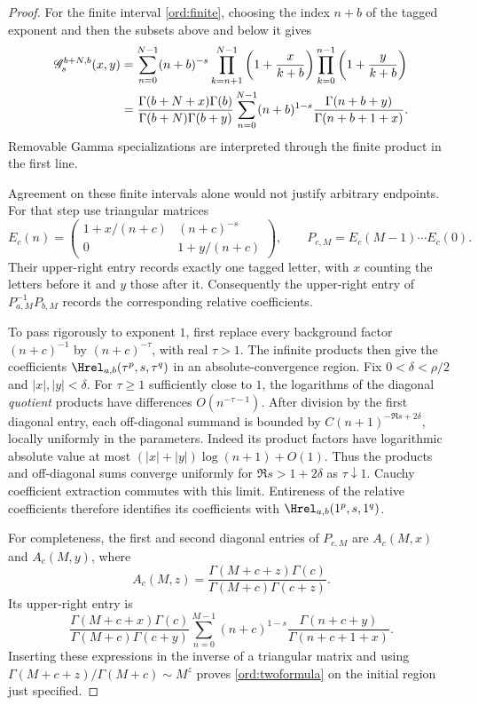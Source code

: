 \begin{proof}
For the finite interval \eqref{ord:finite}, choosing the index $n+b$ of
the tagged exponent and then the subsets above and below it gives
\begin{align}
 \mathscr G_s^{b+N,b}(x,y)
 &=\sum_{n=0}^{N-1}(n+b)^{-s}
       \prod_{k=n+1}^{N-1}\left(1+\frac{x}{k+b}\right)
       \prod_{k=0}^{n-1}\left(1+\frac{y}{k+b}\right) \notag\\
 &=\frac{\Gamma(b+N+x)\Gamma(b)}
          {\Gamma(b+N)\Gamma(b+y)}
    \sum_{n=0}^{N-1}(n+b)^{1-s}
          \frac{\Gamma(n+b+y)}{\Gamma(n+b+1+x)}.
 \label{ord:finitegamma}
\end{align}
Removable Gamma specializations are interpreted through the finite
product in the first line.

Agreement on these finite intervals alone would not justify arbitrary
endpoints.  For that step use triangular matrices
\[
 E_c(n)=
 \begin{pmatrix}
  1+x/(n+c)&(n+c)^{-s}\\
  0&1+y/(n+c)
 \end{pmatrix},
 \qquad P_{c,M}=E_c(M-1)\cdots E_c(0).
\]
Their upper-right entry records exactly one tagged letter, with $x$
counting the letters before it and $y$ those after it.  Consequently
the upper-right entry of $P_{a,M}^{-1}P_{b,M}$ records the corresponding
relative coefficients.

To pass rigorously to exponent $1$, first replace every background
factor $(n+c)^{-1}$ by $(n+c)^{-\tau}$, with real $\tau>1$.
The infinite products then give the coefficients
$\Hrel_{a,b}(\tau^p,s,\tau^q)$ in an absolute-convergence region.
Fix $0<\delta<\rho/2$ and $|x|,|y|<\delta$.  For $\tau\ge1$
sufficiently close to $1$, the logarithms of the diagonal
\emph{quotient} products have differences $O(n^{-\tau-1})$.
After division by the first diagonal entry, each off-diagonal summand
is bounded by
$C(n+1)^{-\Re s+2\delta}$, locally uniformly in the parameters.
Indeed its product factors have logarithmic absolute value at most
$(|x|+|y|)\log(n+1)+O(1)$.
Thus the products and off-diagonal sums converge uniformly for
$\Re s>1+2\delta$ as $\tau\downarrow1$.  Cauchy coefficient extraction
commutes with this limit.  Entireness of the relative coefficients
therefore identifies its coefficients with
$\Hrel_{a,b}(1^p,s,1^q)$.

For completeness, the first and second diagonal entries of $P_{c,M}$
are $A_c(M,x)$ and $A_c(M,y)$, where
\[
 A_c(M,z)=
   \frac{\Gamma(M+c+z)\Gamma(c)}
        {\Gamma(M+c)\Gamma(c+z)}.
\]
Its upper-right entry is
\[
 \frac{\Gamma(M+c+x)\Gamma(c)}
      {\Gamma(M+c)\Gamma(c+y)}
 \sum_{n=0}^{M-1}(n+c)^{1-s}
       \frac{\Gamma(n+c+y)}{\Gamma(n+c+1+x)}.
\]
Inserting these expressions in the inverse of a triangular matrix and
using $\Gamma(M+c+z)/\Gamma(M+c)\sim M^z$ proves
\eqref{ord:twoformula} on the initial region just specified.


\end{proof}

